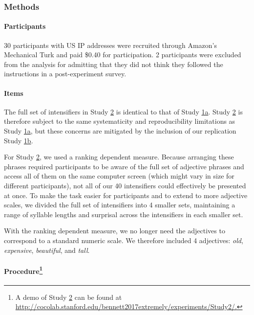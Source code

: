 \documentclass[10pt,letterpaper]{article}
\newcommand{\w}[1]{\emph{#1}}
\begin{document}
\subsubsection{Methods}

\paragraph{Participants}

30 participants with US IP addresses were recruited through Amazon's Mechanical Turk and paid \$0.40 for  participation. 2 participants were excluded from the analysis for admitting that they did not think they followed the instructions in a post-experiment survey.

\paragraph{Items}

The full set of intensifiers in Study \hyperref[sec:study2]{2} is identical to that of Study \hyperref[sec:study1a]{1a}. Study \hyperref[sec:study2]{2} is therefore subject to the same systematicity and reproducibility limitations as Study \hyperref[sec:study1a]{1a}, but these concerns are mitigated by the inclusion of our replication Study \hyperref[sec:study1b]{1b}.

For Study \hyperref[sec:study2]{2}, we used a ranking dependent measure.
Because arranging these phrases required participants to be aware of the full set of adjective phrases and access all of them on the same computer screen (which might vary in size for different participants), not all of our 40 intensifiers could effectively be presented at once.
To make the task easier for participants and to extend to more adjective scales, we divided the full set of intensifiers into 4 smaller sets, maintaining a range of syllable lengths and surprisal across the intensifiers in each smaller set.

With the ranking dependent measure, we no longer need the adjectives to correspond to a standard numeric scale.
We therefore included 4 adjectives: \w{old}, \w{expensive}, \w{beautiful}, and \w{tall}.

\paragraph{Procedure\footnote{A demo of Study \hyperref[sec:study2]{2} can be found at \url{http://cocolab.stanford.edu/bennett2017extremely/experiments/Study2/.}}}
\end{document}
